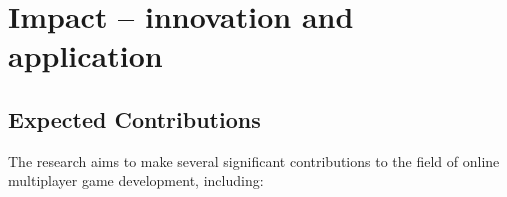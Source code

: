 





\section{Impact -- innovation and application}

\subsection{Expected Contributions}

The research aims to make several significant contributions to the field of online multiplayer game development, including:

